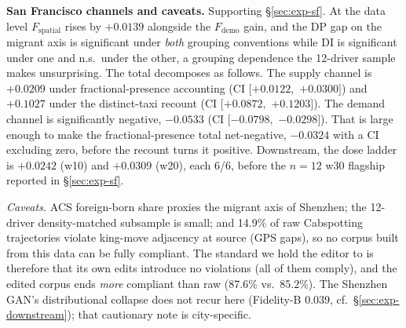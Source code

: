 \textbf{San Francisco channels and caveats.} Supporting \S\ref{sec:exp-sf}.
At the data level $F_{\mathrm{spatial}}$ rises by $+0.0139$ alongside the %
$F_{\mathrm{demo}}$ gain, and the DP gap on the migrant axis is significant
under \emph{both} grouping conventions while DI is significant under one and
n.s.\ under the other, a grouping dependence the 12-driver sample makes
unsurprising. The total decomposes as follows. The supply channel is
$+0.0209$ under fractional-presence accounting
(CI $[+0.0122,$ $+0.0300]$) and $+0.1027$ under the distinct-taxi
recount (CI $[+0.0872,$ $+0.1203]$). The demand channel is
significantly negative, $-0.0533$
(CI $[-0.0798,$ $-0.0298]$). That is large enough to make the
fractional-presence total net-negative, $-0.0324$ with a CI
excluding zero, before the recount turns it positive. Downstream,
the dose ladder is $+0.0242$ (w10) and $+0.0309$ (w20), each 6/6, before the
$n = 12$ w30 flagship reported in \S\ref{sec:exp-sf}.

\emph{Caveats.} ACS foreign-born share proxies the migrant axis of Shenzhen;
the 12-driver density-matched subsample is small; and 14.9\% of raw
Cabspotting trajectories violate king-move adjacency at source (GPS gaps), so
no corpus built from this data can be fully compliant. The standard we hold the
editor to is therefore that its own edits introduce no violations (all of them
comply), and the edited corpus ends \emph{more} compliant than raw (87.6\%
vs.\ 85.2\%). The Shenzhen GAN's distributional collapse does not recur here
(Fidelity-B 0.039, cf.\ \S\ref{sec:exp-downstream}); that cautionary note is
city-specific.

